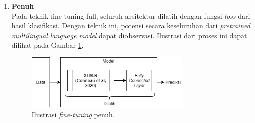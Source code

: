 \begin{enumerate}
		\item \textbf{Penuh}\\
		Pada teknik fine-tuning full, seluruh arsitektur dilatih dengan fungsi \textit{loss} dari hasil klasifikasi. Dengan teknik ini, potensi secara keseluruhan dari \textit{pretrained multilingual language model} dapat diobservasi. Ilustrasi dari proses ini dapat dilihat pada Gambar \ref{fig:ilustrasi_full_fine_tune}.

		\begin{figure}[h]
		    \centering
		    \includegraphics[width=0.75\textwidth]{resources/Full-fine-tune.png}
		    \caption{ Ilustrasi \textit{fine-tuning} penuh.}
		    \label{fig:ilustrasi_full_fine_tune}
		\end{figure}

		
	\end{enumerate}

